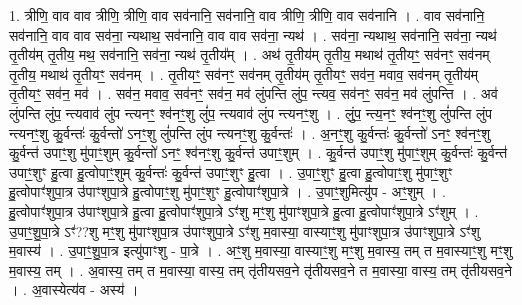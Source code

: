 \documentclass[17pt]{extarticle}
\begin{document}
1. त्रीणि॒ वाव वाव त्रीणि॒ त्रीणि॒ वाव सव॑नानि॒ सव॑नानि॒ वाव त्रीणि॒ त्रीणि॒ वाव सव॑नानि । . वाव सव॑नानि॒ सव॑नानि॒ वाव वाव सव॑ना॒ न्यथाथ॒ सव॑नानि॒ वाव वाव सव॑ना॒ न्यथ॑ । . सव॑ना॒ न्यथाथ॒ सव॑नानि॒ सव॑ना॒ न्यथ॑ तृ॒तीय॑म् तृ॒तीय॒ मथ॒ सव॑नानि॒ सव॑ना॒ न्यथ॑ तृ॒तीय᳚म् । . अथ॑ तृ॒तीय॑म् तृ॒तीय॒ मथाथ॑ तृ॒तीयꣳ॒॒ सव॑नꣳ॒॒ सव॑नम् तृ॒तीय॒ मथाथ॑ तृ॒तीयꣳ॒॒ सव॑नम् । . तृ॒तीयꣳ॒॒ सव॑नꣳ॒॒ सव॑नम् तृ॒तीय॑म् तृ॒तीयꣳ॒॒ सव॑न॒ मवाव॒ सव॑नम् तृ॒तीय॑म् तृ॒तीयꣳ॒॒ सव॑न॒ मव॑ । . सव॑न॒ मवाव॒ सव॑नꣳ॒॒ सव॑न॒ मव॑ लुंपन्ति लुंप॒ न्त्यव॒ सव॑नꣳ॒॒ सव॑न॒ मव॑ लुंपन्ति । . अव॑ लुंपन्ति लुंप॒ न्त्यवाव॑ लुंप न्त्यनꣳ॒॒ श्व॑नꣳ॒॒शु लुं॑प॒ न्त्यवाव॑ लुंप न्त्यनꣳ॒॒शु । . लुं॒प॒ न्त्य॒नꣳ॒॒ श्व॑नꣳ॒॒शु लुं॑पन्ति लुंप न्त्यनꣳ॒॒शु कु॒र्वन्तः॑ कु॒र्वन्तो॑ ऽनꣳ॒॒शु लुं॑पन्ति लुंप न्त्यनꣳ॒॒शु कु॒र्वन्तः॑ । . अ॒नꣳ॒॒शु कु॒र्वन्तः॑ कु॒र्वन्तो॑ ऽनꣳ॒॒ श्व॑नꣳ॒॒शु कु॒र्वन्त॑ उपाꣳ॒॒शु मु॑पाꣳ॒॒शुम् कु॒र्वन्तो॑ ऽनꣳ॒॒ श्व॑नꣳ॒॒शु कु॒र्वन्त॑ उपाꣳ॒॒शुम् । . कु॒र्वन्त॑ उपाꣳ॒॒शु मु॑पाꣳ॒॒शुम् कु॒र्वन्तः॑ कु॒र्वन्त॑ उपाꣳ॒॒शुꣳ हु॒त्वा हु॒त्वोपाꣳ॒॒शुम् कु॒र्वन्तः॑ कु॒र्वन्त॑ उपाꣳ॒॒शुꣳ हु॒त्वा । . उ॒पाꣳ॒॒शुꣳ हु॒त्वा हु॒त्वोपाꣳ॒॒शु मु॑पाꣳ॒॒शुꣳ हु॒त्वोपाꣳ॑शुपा॒त्र उ॑पाꣳशुपा॒त्रे 
हु॒त्वोपाꣳ॒॒शु मु॑पाꣳ॒॒शुꣳ हु॒त्वोपाꣳ॑शुपा॒त्रे । . उ॒पाꣳ॒॒शुमित्यु॑प - अꣳ॒॒शुम् । . हु॒त्वोपाꣳ॑शुपा॒त्र उ॑पाꣳशुपा॒त्रे हु॒त्वा हु॒त्वोपाꣳ॑शुपा॒त्रे ऽꣳ॑शु मꣳ॒॒शु मु॑पाꣳशुपा॒त्रे हु॒त्वा हु॒त्वोपाꣳ॑शुपा॒त्रे ऽꣳ॑शुम् । . उ॒पाꣳ॒॒शु॒पा॒त्रे ऽꣳ॑??शु मꣳ॒॒शु मु॑पाꣳशुपा॒त्र उ॑पाꣳशुपा॒त्रे ऽꣳ॑शु म॒वास्या॒ 
वास्याꣳ॒॒शु मु॑पाꣳशुपा॒त्र उ॑पाꣳशुपा॒त्रे ऽꣳ॑शु म॒वास्य॑ । . उ॒पाꣳ॒॒शु॒पा॒त्र इत्यु॑पाꣳशु - पा॒त्रे । . अꣳ॒॒शु म॒वास्या॒ वास्याꣳ॒॒शु मꣳ॒॒शु म॒वास्य॒ तम् त म॒वास्याꣳ॒॒शु मꣳ॒॒शु म॒वास्य॒ तम् । . अ॒वास्य॒ तम् त म॒वास्या॒ वास्य॒ तम् तृ॑तीयसव॒ने तृ॑तीयसव॒ने त म॒वास्या॒ वास्य॒ तम् तृ॑तीयसव॒ने । . अ॒वास्येत्य॑व - अस्य॑ । \newline
\end{document}
